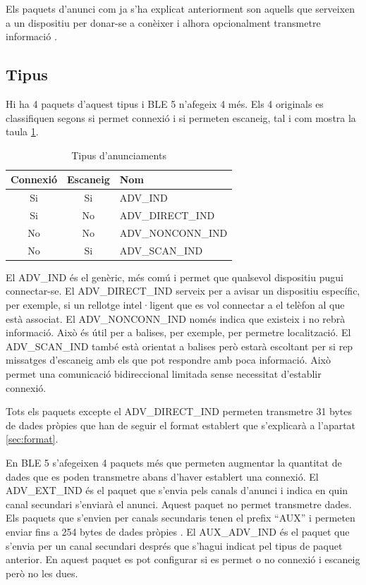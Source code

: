 Els paquets d'anunci com ja s'ha explicat anteriorment son aquells que serveixen a un dispositiu per donar-se a conèixer i alhora opcionalment transmetre informació \cite{Advertising}.

\subsection{Tipus}
Hi ha 4 paquets d'aquest tipus i BLE 5 n'afegeix 4 més.
Els 4 originals es classifiquen segons si permet connexió i si permeten escaneig, tal i com mostra la taula \ref{tab:Advertisment_Types}.

\begin{table}[!h]
	\begin{center}
		\begin{tabular}{|c|c|l|}
			\hline
			Connexió	&	Escaneig	&	Nom	\\	\hline
			Si			&	Si			&	ADV\_IND	\\	\hline
			Si			&	No			&	ADV\_DIRECT\_IND	\\	\hline
			No			&	No			&	ADV\_NONCONN\_IND	\\	\hline
			No			&	Si			&	ADV\_SCAN\_IND	\\	\hline
		\end{tabular}
	\end{center}
\caption{Tipus d'anunciaments}
\label{tab:Advertisment_Types}
\end{table}


El ADV\_IND és el genèric, més comú i permet que qualsevol dispositiu pugui connectar-se.
El ADV\_DIRECT\_IND serveix per a avisar un dispositiu específic, per exemple, si un rellotge intel·ligent que es vol connectar a el telèfon al que està associat.
El ADV\_NONCONN\_IND només indica que existeix i no rebrà informació.
Això és útil per a balises, per exemple, per permetre localització.
El ADV\_SCAN\_IND també està orientat a balises però estarà escoltant per si rep missatges d'escaneig amb els que pot respondre amb poca informació.
Això permet una comunicació bidireccional limitada sense necessitat d'establir connexió.

Tots els paquets excepte el ADV\_DIRECT\_IND permeten transmetre 31 bytes de dades pròpies que han de seguir el format establert que s'explicarà a l'apartat \ref{sec:format}.

\label{Advertising_Extension_PDU}
En BLE 5 s'afegeixen 4 paquets més que permeten augmentar la quantitat de dades que es poden transmetre abans d'haver establert una connexió.
El ADV\_EXT\_IND és el paquet que s'envia pels canals d'anunci i indica en quin canal secundari s'enviarà el anunci. Aquest paquet no permet transmetre dades.
Els paquets que s'envien per canals secundaris tenen el prefix ``AUX'' i permeten enviar fins a 254 bytes de dades pròpies .
El AUX\_ADV\_IND és el paquet que s'envia per un canal secundari després que s'hagui indicat pel tipus de paquet anterior.
En aquest paquet es pot configurar si es permet o no connexió i escaneig però no les dues.

